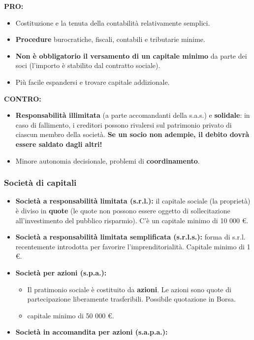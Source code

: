 \documentclass[../main.tex]{subfiles}
\begin{document}
\textbf{PRO:}
\begin{itemize}
\item Costituzione e la tenuta della contabilità relativamente semplici.

\item \textbf{Procedure} burocratiche, fiscali, contabili e tributarie minime.

\item \textbf{Non è obbligatorio il versamento di un capitale minimo} da parte dei soci (l'importo è stabilito dal contratto sociale).

\item Più facile espandersi e trovare capitale addizionale.

\end{itemize}

\textbf{CONTRO:}
\begin{itemize}
\item \textbf{Responsabilità illimitata} (a parte accomandanti della s.a.s.) e \textbf{solidale}: in caso di fallimento, i creditori possono rivalersi sul patrimonio privato di ciascun membro della società. \textbf{Se un socio non adempie, il debito dovrà essere saldato dagli altri!}
\item Minore autonomia decisionale, problemi di \textbf{coordinamento}.

\end{itemize}

\subsubsection{Società di capitali}

\begin{itemize}
\item \textbf{Società a responsabilità limitata (s.r.l.):} il capitale sociale (la proprietà) è diviso in \textbf{quote} (le quote non possono essere oggetto di sollecitazione all'investimento del pubblico risparmio). C'è un capitale minimo di 10 000 \euro.

\item \textbf{Società a responsabilità limitata semplificata (s.r.l.s.):} forma di s.r.l. recentemente introdotta per favorire l'imprenditorialità. Capitale minimo di 1 \euro.

\item \textbf{Società per azioni (s.p.a.):}

\begin{itemize}
\item
Il pratimonio sociale è costituito da \textbf{azioni}. Le azioni sono quote di partecipazione liberamente trasferibili. Possibile quotazione in Borsa.
\item capitale minimo di 50 000 \euro.
\end{itemize}

\item \textbf{Società in accomandita per azioni (s.a.p.a.):}

\end{itemize}
\end{document}
